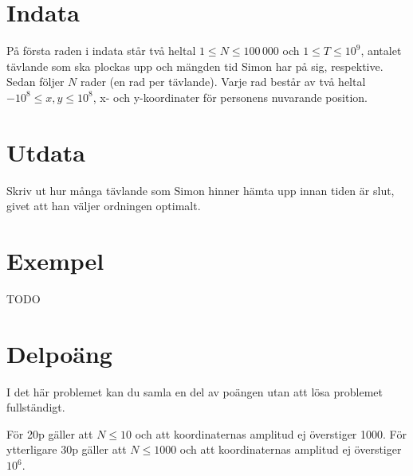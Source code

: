 \section*{Indata}
På första raden i indata står två heltal $1 \leq N \leq 100\,000$ och $1 \leq T \leq 10^9$, antalet tävlande som ska plockas upp och mängden tid Simon har på sig, respektive. Sedan följer $N$ rader (en rad per tävlande). Varje rad består av två heltal $-10^8 \leq x, y \leq 10^8$, x- och y-koordinater för personens nuvarande position.

\section*{Utdata}
Skriv ut hur många tävlande som Simon hinner hämta upp innan tiden är slut, givet att han väljer ordningen optimalt.

\section*{Exempel}
TODO

\section*{Delpoäng}
I det här problemet kan du samla en del av poängen utan att lösa problemet fullständigt.

För 20p gäller att $N \leq 10$ och att koordinaternas amplitud ej överstiger 1000. För ytterligare 30p gäller att $N \leq 1000$ och att koordinaternas amplitud ej överstiger $10^6$.
